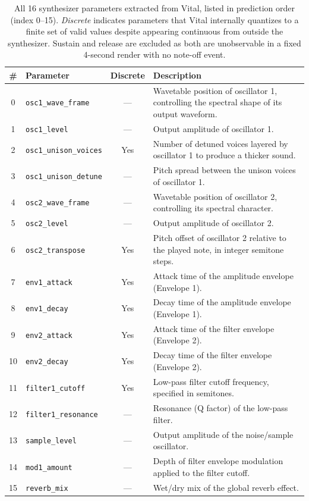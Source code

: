 \begin{table}[H]
\centering
\renewcommand{\arraystretch}{1.35}
\begin{tabular}{clcp{6.5cm}}
\hline
\textbf{\#} & \textbf{Parameter} & \textbf{Discrete} & \textbf{Description} \\
\hline
0  & \texttt{osc1\_wave\_frame}    & ---  & Wavetable position of oscillator 1, controlling the spectral shape of its output waveform. \\
1  & \texttt{osc1\_level}          & ---  & Output amplitude of oscillator 1. \\
2  & \texttt{osc1\_unison\_voices} & Yes  & Number of detuned voices layered by oscillator 1 to produce a thicker sound. \\
3  & \texttt{osc1\_unison\_detune} & ---  & Pitch spread between the unison voices of oscillator 1. \\
4  & \texttt{osc2\_wave\_frame}    & ---  & Wavetable position of oscillator 2, controlling its spectral character. \\
5  & \texttt{osc2\_level}          & ---  & Output amplitude of oscillator 2. \\
6  & \texttt{osc2\_transpose}      & Yes  & Pitch offset of oscillator 2 relative to the played note, in integer semitone steps. \\
7  & \texttt{env1\_attack}         & Yes  & Attack time of the amplitude envelope (Envelope 1). \\
8  & \texttt{env1\_decay}          & Yes  & Decay time of the amplitude envelope (Envelope 1). \\
9  & \texttt{env2\_attack}         & Yes  & Attack time of the filter envelope (Envelope 2). \\
10 & \texttt{env2\_decay}          & Yes  & Decay time of the filter envelope (Envelope 2). \\
11 & \texttt{filter1\_cutoff}      & Yes  & Low-pass filter cutoff frequency, specified in semitones. \\
12 & \texttt{filter1\_resonance}   & ---  & Resonance (Q factor) of the low-pass filter. \\
13 & \texttt{sample\_level}        & ---  & Output amplitude of the noise/sample oscillator. \\
14 & \texttt{mod1\_amount}         & ---  & Depth of filter envelope modulation applied to the filter cutoff. \\
15 & \texttt{reverb\_mix}          & ---  & Wet/dry mix of the global reverb effect. \\
\hline
\end{tabular}
\vspace{0.3cm}
\caption{All 16 synthesizer parameters extracted from Vital, listed in prediction order (index 0--15). \textit{Discrete} indicates parameters that Vital internally quantizes to a finite set of valid values despite appearing continuous from outside the synthesizer. Sustain and release are excluded as both are unobservable in a fixed 4-second render with no note-off event.}
\label{tab:parameters}
\end{table}

